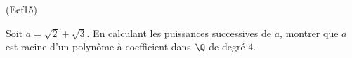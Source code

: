\begin{tiny}(Eef15)\end{tiny} Soit $a=\sqrt{2} + \sqrt{3}$. En calculant les puissances successives de $a$, montrer que $a$ est racine d'un polynôme à coefficient dans $\Q$ de degré $4$.